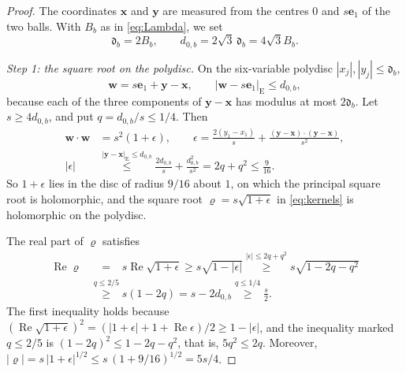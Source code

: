 \documentclass[11pt]{amsart}
\numberwithin{equation}{section}
\theoremstyle{definition}
\newcommand{\bx}{\mathbf x}
\newcommand{\by}{\mathbf y}
\newcommand{\eone}{\mathbf e_1}
\newcommand{\Rea}{\operatorname{Re}}
\begin{document}
\begin{proof}
The coordinates \(\bx\) and \(\by\) are measured from the centres \(0\)
and \(s\eone\) of the two balls. With \(B_b\) as in \eqref{eq:Lambda},
we set
\[
 \mathfrak d_b=2B_b,\qquad
 d_{0,b}=2\sqrt3\,\mathfrak d_b=4\sqrt3B_b.
\]

\smallskip
\emph{Step 1: the square root on the polydisc.}
On the six-variable polydisc
\(|x_j|,|y_j|\le\mathfrak d_b\),
\[
 \mathbf w=s\eone+\by-\bx,\qquad
 |\mathbf w-s\eone|_{\mathrm E}\le d_{0,b},
\]
because each of the three components of \(\by-\bx\) has modulus at
most \(2\mathfrak d_b\). Let \(s\ge4d_{0,b}\), and put
\(q=d_{0,b}/s\le1/4\). Then
\[
 \begin{split}
 \mathbf w\cdot\mathbf w&=s^2(1+\epsilon),\qquad
 \epsilon=\frac{2(y_1-x_1)}s+\frac{(\by-\bx)\cdot(\by-\bx)}{s^2},\\
 |\epsilon|&\overset{|\by-\bx|_{\mathrm E}\le d_{0,b}}{\le}
 \frac{2d_{0,b}}s+\frac{d_{0,b}^2}{s^2}=2q+q^2\le\frac9{16}.
 \end{split}
\]
So \(1+\epsilon\) lies in the disc of radius \(9/16\) about \(1\), on
which the principal square root is holomorphic, and the square root
\(\varrho=s\sqrt{1+\epsilon}\) in \eqref{eq:kernels} is holomorphic on
the polydisc.

The real part of \(\varrho\) satisfies
\[
 \begin{split}
 \Rea\varrho
 &\overset{\phantom{q\le2/5}}{=}s\Rea\sqrt{1+\epsilon}
 \ge s\sqrt{1-|\epsilon|}
 \overset{|\epsilon|\le2q+q^2}{\ge}s\sqrt{1-2q-q^2}\\
 &\overset{q\le2/5}{\ge}s(1-2q)
 =s-2d_{0,b}
 \overset{q\le1/4}{\ge}\frac s2.
 \end{split}
\]
The first inequality holds because
\((\Rea\sqrt{1+\epsilon})^2=(|1+\epsilon|+1+\Rea\epsilon)/2\ge1-|\epsilon|\),
and the inequality marked \(q\le2/5\) is \((1-2q)^2\le1-2q-q^2\), that
is, \(5q^2\le2q\). Moreover,
\(|\varrho|=s\,|1+\epsilon|^{1/2}\le s\,(1+9/16)^{1/2}=5s/4\).


\end{proof}
\end{document}
